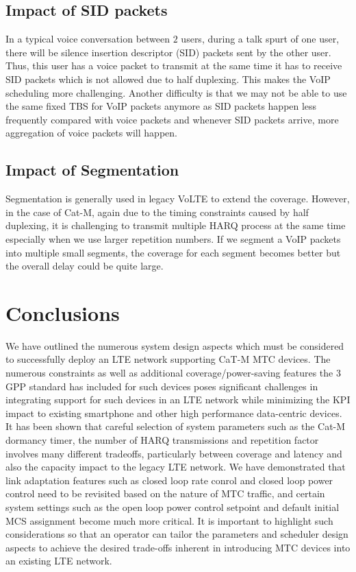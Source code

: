 \documentclass[conference,compsoc]{IEEEtran}
\begin{document}
\subsection{Impact of SID packets}
In a typical voice conversation between $2$ users, during a talk spurt of one user, there will be silence insertion descriptor (SID) packets sent by the other user. Thus, this user has a voice packet to transmit at the same time it has to receive SID packets which is not allowed due to half duplexing. This makes the VoIP scheduling more challenging. Another difficulty is that we may not be able to use the same fixed TBS for VoIP packets anymore as SID packets happen less frequently compared with voice packets and whenever SID packets arrive, more aggregation of voice packets will happen.

\subsection{Impact of Segmentation}
Segmentation is generally used in legacy VoLTE to extend the coverage. However, in the case of Cat-M, again due to the timing constraints caused by half duplexing, it is challenging to transmit multiple HARQ process at the same time especially when we use larger repetition numbers. If we segment a VoIP packets into multiple small segments, the coverage for each segment becomes better but the overall delay could be quite large.

\section{Conclusions}
We have outlined the numerous system design aspects which must be considered to successfully deploy an LTE network supporting CaT-M MTC devices. The numerous constraints as well as additional coverage/power-saving features the $3$GPP standard has included for such devices poses significant challenges in integrating support for such devices in an LTE network while minimizing the KPI impact to existing smartphone and other high performance data-centric devices. It has been shown that careful selection of system parameters such as the Cat-M dormancy timer, the number of HARQ transmissions and repetition factor involves many different tradeoffs, particularly between coverage and latency and also the capacity impact to the legacy LTE network. We have demonstrated that link adaptation features such as closed loop rate conrol and closed loop power control need to be revisited based on the nature of MTC traffic, and certain system settings such as the open loop power control setpoint and default initial MCS assignment become much more critical. It is important to highlight such considerations so that an operator can tailor the parameters and scheduler design aspects to achieve the desired trade-offs inherent in introducing MTC devices into an existing LTE network.
\end{document}
